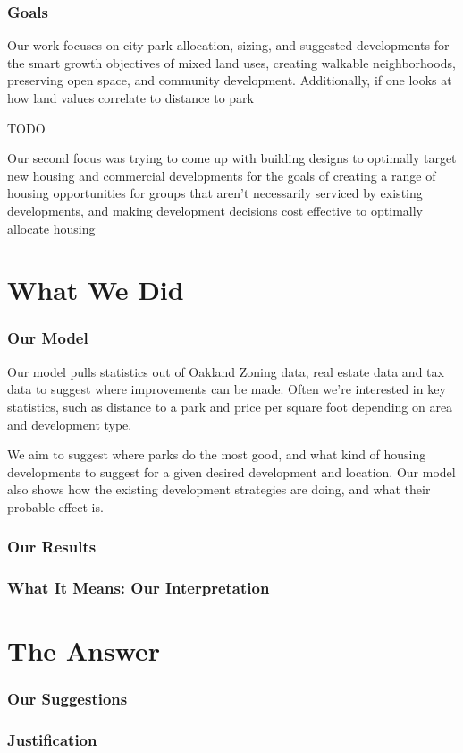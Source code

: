 \documentclass[]{report}
\begin{document}
	\section{Goals}
	Our work focuses on city park allocation, sizing, and suggested developments for the smart growth objectives of mixed land uses, creating walkable neighborhoods, preserving open space, and community development. Additionally, if one looks at how land values correlate to distance to park
	
	TODO
	
	Our second focus was trying to come up with building designs to optimally target new housing and commercial developments for the goals of creating a range of housing opportunities for groups that aren't necessarily serviced by existing developments, and making development decisions cost effective to optimally allocate housing
	
	
\part{What We Did}
	\section{Our Model}
	Our model pulls statistics out of Oakland Zoning data, real estate data and tax data to suggest where improvements can be made. Often we're interested in key statistics, such as distance to a park and price per square foot depending on area and development type.
	
	We aim to suggest where parks do the most good, and what kind of housing developments to suggest for a given desired development and location. Our model also shows how the existing development strategies are doing, and what their probable effect is.
	
	\section{Our Results}
	\section{What It Means: Our Interpretation}
	
\part{The Answer}
	\section{Our Suggestions}
	\section{Justification}
	
\end{document}
